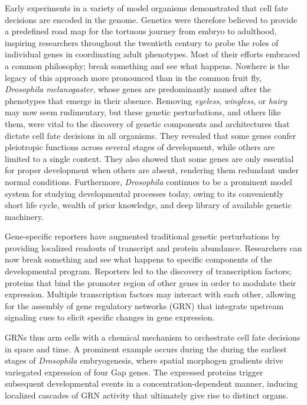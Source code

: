 Early experiments in a variety of model organisms demonstrated that cell fate decisions are encoded in the genome. Genetics were therefore believed to provide a predefined road map for the tortuous journey from embryo to adulthood, inspiring researchers throughout the twentieth century to probe the roles of individual genes in coordinating adult phenotypes. Most of their efforts embraced a common philosophy; break something and see what happens. Nowhere is the legacy of this approach more pronounced than in the common fruit fly, \textit{Drosophila melanogaster}, whose genes are predominantly named after the phenotypes that emerge in their absence. Removing \textit{eyeless}, \textit{wingless}, or \textit{hairy} may now seem rudimentary, but these genetic perturbations, and others like them, were vital to the discovery of genetic components and architectures that dictate cell fate decisions in all organisms. They revealed that some genes confer pleiotropic functions across several stages of development, while others are limited to a single context. They also showed that some genes are only essential for proper development when others are absent, rendering them redundant under normal conditions. Furthermore, \emph{Drosophila} continues to be a prominent model system for studying developmental processes today, owing to its conveniently short life cycle, wealth of prior knowledge, and deep library of available genetic machinery.

Gene-specific reporters have augmented traditional genetic perturbations by providing localized readouts of transcript and protein abundance. Researchers can now break something and see what happens to specific components of the developmental program. Reporters led to the discovery of transcription factors; proteins that bind the promoter region of other genes in order to modulate their expression. Multiple transcription factors may interact with each other, allowing for the assembly of gene regulatory networks (GRN) that integrate upstream signaling cues to elicit specific changes in gene expression. 

GRNs thus arm cells with a chemical mechanism to orchestrate cell fate decisions in space and time. A prominent example occurs during the during the earliest stages of \textit{Drosophila} embryogenesis, where spatial morphogen gradients drive variegated expression of four Gap genes. The expressed proteins trigger subsequent developmental events in a concentration-dependent manner, inducing localized cascades of GRN activity that ultimately give rise to distinct organs. 

